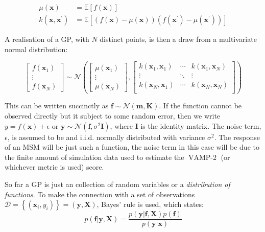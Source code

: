 \begin{equation}
    \begin{aligned}
    \mu\left(\mathbf{x}\right) &=\mathbb{E}\left[f\left(\mathbf{x}\right)\right] \\
    k\left(\mathbf{x}, \mathbf{x}^{\prime}\right) &=\mathbb{E}\left[(f(\mathbf{x})-\mu(\mathbf{x}))\left(f\left(\mathbf{x}^{\prime}\right)-\mu\left(\mathbf{x}^{\prime}\right)\right)\right]
    \end{aligned}
\end{equation}

A realisation of a GP, with $N$ distinct points, is then a draw from a multivariate normal distribution: 

\begin{equation}
\begin{bmatrix}  f\left(\mathbf{x}_{1}\right) \\ \vdots \\ f\left(\mathbf{x}_{N}\right) \end{bmatrix} 
\sim 
\mathcal{N}\left( 
\begin{bmatrix} \mu\left(\mathbf{x}_{1}\right) \\  \vdots \\ \mu\left(\mathbf{x}_{N}\right) \end{bmatrix}, 
\begin{bmatrix}
k(\mathbf{x}_{1}, \mathbf{x}_{1}) & \cdots & k(\mathbf{x}_{1}, \mathbf{x}_{N}) \\
\vdots & \ddots & \vdots \\
k(\mathbf{x}_{N}, \mathbf{x}_{1}) & \cdots & k(\mathbf{x}_{N}, \mathbf{x}_{N}) \\
\end{bmatrix}
\right)
\end{equation}

This can be written succinctly as $\mathbf{f} \sim \mathcal{N}(\mathbf{m}, \mathbf{K})$. If the function cannot be observed directly but it subject to some random error, then we write $y = f(\mathbf{x}) + \epsilon$ or  $\mathbf{y} \sim \mathcal{N}(\mathbf{f}, \sigma^{2}\mathbf{I})$, where $\mathbf{I}$ is the identity matrix.  The noise term, $\epsilon$, is assumed to be and i.i.d. normally distributed with variance $\sigma^{2}$. The response of an MSM will be just such a function, the noise term in this case will be due to the finite amount of simulation data used to estimate the $\operatorname{VAMP-2}$ (or whichever metric is used) score. 

So far a GP is just an collection of random variables or a \emph{distribution of functions}.  To make the connection with a set of observations $\mathcal{D}=\left\{(\mathbf{x}_{i}, y_{i})\right\} = (\mathbf{y}, \mathbf{X})$, Bayes' rule is used, which states: 
\begin{equation}\label{eqn:ya_boy_bayes}
    p(\mathbf{f}|\mathbf{y}, \mathbf{X})  = \frac{p(\mathbf{y}|\mathbf{f}, \mathbf{X})p(\mathbf{f})}{p(\mathbf{y}|\mathbf{x})}
\end{equation}


